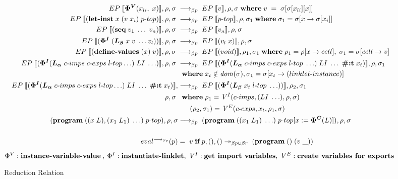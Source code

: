 \documentclass[sigplan,screen,anonymous]{acmart}
\def\dash {\text{-}}
\begin{document}
\begin{figure*}[tbp]
  \begin{align*}
    \redinput{\bm{\Phi^V}(x_{li},\; x)} \rel \redoutput{v}{\rho}{\sigma} \where v\; =\; \sigma[\sigma[x_{li}][x]] \\
    \redinput{(\textbf{let\dash inst}\; x\; (v\;x_i)\; p\dash top)} \rel \redoutput{p\dash top}{\rho}{\sigma_1} \where \sigma_1 = \sigma[x\rightarrow \sigma[x_i]] \\
    \redinput{(\textbf{seq}\; v_{1}\; \ldots\; v_{n})} \rel \redoutput{v_{n}}{\rho}{\sigma} \\
    \redinput{(\bm{\Phi^I}\; (\lb\; x\; v\; \ldots v_{l}))} \rel \redoutput{(v_{l}\; x)}{\rho}{\sigma} \\
    \redinput{(\textbf{define\dash values}\; (x)\; v)} \rel \redoutput{(void)}{\rho_1}{\sigma_1} \where \rho_1 = \rho[x\rightarrow cell],\; \sigma_1 = \sigma[cell\rightarrow v] \\
    \redinput{(\bm{\Phi^I}(\la\; c\dash imps \; c\dash exps \; l\dash top \ldots)\; LI\; \ldots)} \rel \redoutput{(\bm{\Phi^I}(\la\; c\dash imps \; c\dash exps \; l\dash top\; \ldots)\; LI\; \ldots\; \textbf{\#:t}\; x_{t})}{\rho}{\sigma_1} \\
    \;          &\;\; \where x_t \notin \mathit{dom}(\sigma), \sigma_1 = \sigma[x_t\rightarrow (linklet\dash instance)] \\
    EP\;\llbracket (\bm{\Phi^I}(\la\; c\dash imps \; c\dash exps \; l\dash top \ldots)\; LI\; \ldots\; \textbf{\#:t}\; x_{t}) \rrbracket, \rel \redoutput{(\bm{\Phi^I}(\lb\; x_{t}\; l\dash top\; \ldots))}{\rho_2}{\sigma_1} \\
    \rho, \sigma\; &\;\; \where \rho_1 = \mathit{V}^I(c\dash imps, (LI\; \ldots), \rho, \sigma) \\
    \;          &\;\; \hspace{0.4cm} (\rho_2, \sigma_1) = \mathit{V}^E(c\dash exps, x_t, \rho_1, \sigma) \\
    (\textbf{program}\; ((x\;L),(x_1\;L_1)\;\ldots)\;p\dash top), \rho, \sigma &\longrightarrow_{\beta p}\; (\textbf{program}\; ((x_1\;L_1)\;\ldots)\;p\dash top[x := \bm{\Phi^C}(L)]), \rho, \sigma \\ \\
    eval^{\longrightarrow_{\beta p}}(p) &=\; v\; \textbf{if}\; p, (), () \twoheadrightarrow_{\beta p\cup\beta r} \; (\textbf{program}\; ()\;(v\;\_)) \\
  \end{align*}
  \hfill \footnotesize $\Phi^V : \textbf{instance\dash variable\dash value}\:,\: \Phi^I : \textbf{instantiate\dash linklet},\: \mathit{V}^I : \textbf{get  import variables},\: \mathit{V}^E : \textbf{create variables for exports}$
\caption{Reduction Relation}
\label{fig:reduction}
\end{figure*}
\end{document}

